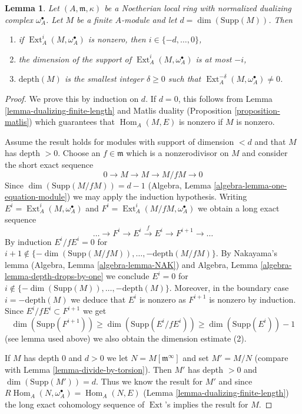 \documentclass{stacks-project}
\theoremstyle{plain}
\newtheorem{lemma}[subsection]{Lemma}
\theoremstyle{definition}
\theoremstyle{remark}
\numberwithin{equation}{subsection}
\def\Hom{\mathop{\mathrm{Hom}}\nolimits}
\def\Ext{\mathop{\mathrm{Ext}}\nolimits}
\begin{document}
\begin{lemma}
\label{lemma-sitting-in-degrees}
Let $(A, \mathfrak m, \kappa)$ be a Noetherian local ring with
normalized dualizing complex $\omega_A^\bullet$. Let $M$ be a finite
$A$-module and let $d = \dim(\text{Supp}(M))$. Then
\begin{enumerate}
\item if $\Ext^i_A(M, \omega_A^\bullet)$ is nonzero, then
$i \in \{-d, \ldots, 0\}$,
\item the dimension of the support of $\Ext^i_A(M, \omega_A^\bullet)$
is at most $-i$,
\item $\text{depth}(M)$ is the smallest integer $\delta \geq 0$ such that
$\Ext^{-\delta}_A(M, \omega_A^\bullet) \not = 0$.
\end{enumerate}
\end{lemma}

\begin{proof}
We prove this by induction on $d$. If $d = 0$, this follows from
Lemma \ref{lemma-dualizing-finite-length} and Matlis duality
(Proposition \ref{proposition-matlis}) which guarantees that
$\Hom_A(M, E)$ is nonzero if $M$ is nonzero.

\medskip\noindent
Assume the result holds for modules with support of dimension $< d$ and that
$M$ has depth $> 0$. Choose an $f \in \mathfrak m$ which is a nonzerodivisor
on $M$ and consider the short exact sequence
$$
0 \to M \to M \to M/fM \to 0
$$
Since $\dim(\text{Supp}(M/fM)) = d - 1$
(Algebra, Lemma \ref{algebra-lemma-one-equation-module}) we
may apply the induction hypothesis.
Writing
$E^i = \Ext^i_A(M, \omega_A^\bullet)$ and
$F^i = \Ext^i_A(M/fM, \omega_A^\bullet)$
we obtain a long exact sequence
$$
\ldots \to F^i \to E^i \xrightarrow{f} E^i \to F^{i + 1} \to \ldots
$$
By induction $E^i/fE^i = 0$ for
$i + 1 \not \in \{-\dim(\text{Supp}(M/fM)), \ldots, -\text{depth}(M/fM)\}$.
By Nakayama's lemma (Algebra, Lemma \ref{algebra-lemma-NAK})
and Algebra, Lemma \ref{algebra-lemma-depth-drops-by-one}
we conclude $E^i = 0$ for
$i \not \in \{-\dim(\text{Supp}(M)), \ldots, -\text{depth}(M)\}$.
Moreover, in the boundary case $i = - \text{depth}(M)$ we deduce that $E^i$
is nonzero as $F^{i + 1}$ is nonzero by induction.
Since $E^i/fE^i \subset F^{i + 1}$ we get
$$
\dim(\text{Supp}(F^{i + 1})) \geq \dim(\text{Supp}(E^i/fE^i))
\geq \dim(\text{Supp}(E^i)) - 1
$$
(see lemma used above) we also obtain the dimension estimate (2).

\medskip\noindent
If $M$ has depth $0$ and $d > 0$ we let $N = M[\mathfrak m^\infty]$ and set
$M' = M/N$ (compare with Lemma \ref{lemma-divide-by-torsion}).
Then $M'$ has depth $> 0$ and $\dim(\text{Supp}(M')) = d$.
Thus we know the result for $M'$ and since
$R\Hom_A(N, \omega_A^\bullet) = \Hom_A(N, E)$
(Lemma \ref{lemma-dualizing-finite-length})
the long exact cohomology sequence of $\Ext$'s implies the
result for $M$.
\end{proof}
\end{document}
